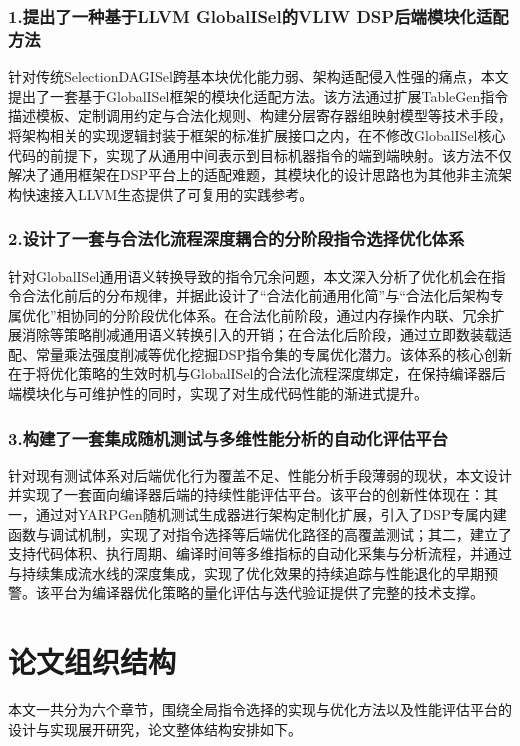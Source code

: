 \subsubsection{1.提出了一种基于LLVM GlobalISel的VLIW DSP后端模块化适配方法}
针对传统SelectionDAGISel跨基本块优化能力弱、架构适配侵入性强的痛点，本文提出了一套基于GlobalISel框架的模块化适配方法。该方法通过扩展TableGen指令描述模板、定制调用约定与合法化规则、构建分层寄存器组映射模型等技术手段，将架构相关的实现逻辑封装于框架的标准扩展接口之内，在不修改GlobalISel核心代码的前提下，实现了从通用中间表示到目标机器指令的端到端映射。该方法不仅解决了通用框架在DSP平台上的适配难题，其模块化的设计思路也为其他非主流架构快速接入LLVM生态提供了可复用的实践参考。


\subsubsection{2.设计了一套与合法化流程深度耦合的分阶段指令选择优化体系}
针对GlobalISel通用语义转换导致的指令冗余问题，本文深入分析了优化机会在指令合法化前后的分布规律，并据此设计了“合法化前通用化简”与“合法化后架构专属优化”相协同的分阶段优化体系。在合法化前阶段，通过内存操作内联、冗余扩展消除等策略削减通用语义转换引入的开销；在合法化后阶段，通过立即数装载适配、常量乘法强度削减等优化挖掘DSP指令集的专属优化潜力。该体系的核心创新在于将优化策略的生效时机与GlobalISel的合法化流程深度绑定，在保持编译器后端模块化与可维护性的同时，实现了对生成代码性能的渐进式提升。
	

\subsubsection{3.构建了一套集成随机测试与多维性能分析的自动化评估平台}
针对现有测试体系对后端优化行为覆盖不足、性能分析手段薄弱的现状，本文设计并实现了一套面向编译器后端的持续性能评估平台。该平台的创新性体现在：其一，通过对YARPGen随机测试生成器进行架构定制化扩展，引入了DSP专属内建函数与调试机制，实现了对指令选择等后端优化路径的高覆盖测试；其二，建立了支持代码体积、执行周期、编译时间等多维指标的自动化采集与分析流程，并通过与持续集成流水线的深度集成，实现了优化效果的持续追踪与性能退化的早期预警。该平台为编译器优化策略的量化评估与迭代验证提供了完整的技术支撑。
	

\section{论文组织结构}
本文一共分为六个章节，围绕全局指令选择的实现与优化方法以及性能评估平台的设计与实现展开研究，论文整体结构安排如下。

